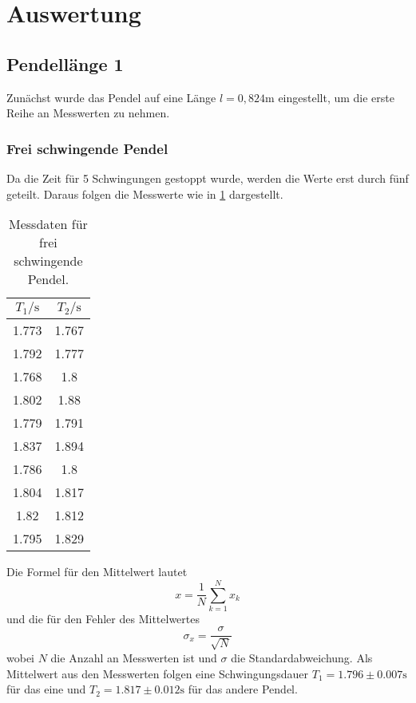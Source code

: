 \section{Auswertung}
\subsection{Pendellänge 1}
Zunächst wurde das Pendel auf eine Länge $l = 0,824 \si{\m}$ eingestellt, um die erste Reihe an Messwerten zu nehmen.

\subsubsection{Frei schwingende Pendel}
Da die Zeit für 5 Schwingungen gestoppt wurde, werden die
Werte erst durch fünf geteilt. Daraus folgen die Messwerte
wie in \ref{tab:frei} dargestellt.
\begin{table}[H]
    \centering
    \caption{Messdaten für frei schwingende Pendel.}
    \label{tab:frei}
    \begin{tabular}{c c}
     \toprule
     $T_1 / \si{\s}$ & $T_2 / \si{\s}$\\
     \midrule
     1.773 & 1.767 \\
     1.792 & 1.777 \\
     1.768 & 1.8 \\
     1.802 & 1.88\\
     1.779 & 1.791\\
     1.837 & 1.894\\
     1.786 & 1.8 \\
     1.804 & 1.817\\
     1.82 & 1.812 \\
     1.795 & 1.829 \\
     \bottomrule
    \end{tabular}
\end{table}
Die Formel für den Mittelwert lautet
\begin{equation}
x = \frac{1}{N} \sum_{k=1}^{N} x_k
\label{eqn:mittel}
\end{equation}
und die für den Fehler des Mittelwertes
\begin{equation}
\sigma_{x} = \frac{\sigma}{\sqrt{N}}
\label{eqn:mif}
\end{equation}
wobei $N$ die Anzahl an Messwerten ist und $\sigma$ die Standardabweichung.
Als Mittelwert aus den Messwerten folgen eine
Schwingungsdauer $T_1 = 1.796\pm 0.007 \si{\s}$ für das eine und 
$T_2 = 1.817\pm 0.012 \si{\s}$ für das andere Pendel.


